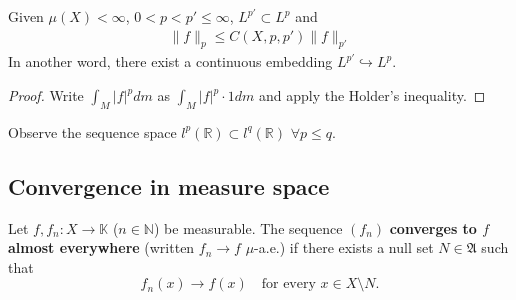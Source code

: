 \begin{theorem}
	Given $\mu(X) < \infty$, $0 < p < p' \leq \infty$, $L^{p'} \subset L^p$ and 
	\begin{align*}
		\|f\|_p \leq C(X, p, p') \|f\|_{p'}
	\end{align*}
	In another word, there exist a continuous embedding $L^{p'} \hookrightarrow L^p$.
\end{theorem}
\begin{proof}
	Write $\int_{M}|f|^p dm $ as $\int_M |f|^p \cdot 1 dm $ and apply the Holder's inequality. 
\end{proof}
\begin{remark}[Counterexample: $\mu(X) = \infty$]
Observe the sequence space $l^p(\mathbb{R}) \subset l^q(\mathbb{R})$ $\forall p \le q$. 
\end{remark}


\subsection{Convergence in measure space }
\begin{definition}
Let $f, f_n : X \to \mathbb{K}$ ($n \in \mathbb{N}$) be measurable. The sequence $(f_n)$ \textbf{converges to $f$ almost everywhere} (written $f_n \to f$ $\mu$-a.e.) if there exists a null set $N \in \mathfrak{A}$ such that
\begin{equation*}
	f_n(x) \to f(x) \quad \text{for every } x \in X \setminus N.
\end{equation*}
\end{definition}

